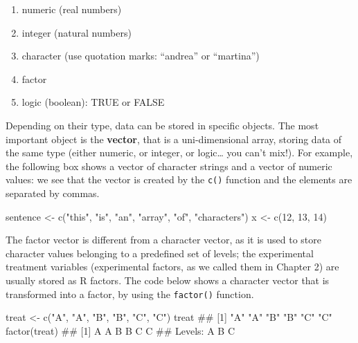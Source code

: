 \documentclass[a4paper,12pt,oneside]{book}
\providecommand{\tightlist}{%
  \setlength{\itemsep}{0pt}\setlength{\parskip}{0pt}}
\newenvironment{Shaded}{\begin{snugshade}}{\end{snugshade}}
\newcommand{\DecValTok}[1]{#1}
\newcommand{\StringTok}[1]{#1}
\newcommand{\DocumentationTok}[1]{#1}
\newcommand{\OtherTok}[1]{#1}
\newcommand{\FunctionTok}[1]{#1}
\newcommand{\NormalTok}[1]{#1}
\begin{document}
\begin{enumerate}
\def\labelenumi{\arabic{enumi}.}
\tightlist
\item
  numeric (real numbers)
\item
  integer (natural numbers)
\item
  character (use quotation marks: ``andrea'' or ``martina'')
\item
  factor
\item
  logic (boolean): TRUE or FALSE
\end{enumerate}

Depending on their type, data can be stored in specific objects. The most important object is the \textbf{vector}, that is a uni-dimensional array, storing data of the same type (either numeric, or integer, or logic\ldots{} you can't mix!). For example, the following box shows a vector of character strings and a vector of numeric values: we see that the vector is created by the \texttt{c()} function and the elements are separated by commas.

\begin{Shaded}
\begin{Highlighting}[]
\NormalTok{sentence }\OtherTok{\textless{}{-}} \FunctionTok{c}\NormalTok{(}\StringTok{"this"}\NormalTok{, }\StringTok{"is"}\NormalTok{, }\StringTok{"an"}\NormalTok{, }\StringTok{"array"}\NormalTok{, }\StringTok{"of"}\NormalTok{, }\StringTok{"characters"}\NormalTok{)}
\NormalTok{x }\OtherTok{\textless{}{-}} \FunctionTok{c}\NormalTok{(}\DecValTok{12}\NormalTok{, }\DecValTok{13}\NormalTok{, }\DecValTok{14}\NormalTok{)}
\end{Highlighting}
\end{Shaded}

The factor vector is different from a character vector, as it is used to store character values belonging to a predefined set of levels; the experimental treatment variables (experimental factors, as we called them in Chapter 2) are usually stored as R factors. The code below shows a character vector that is transformed into a factor, by using the \texttt{factor()} function.

\begin{Shaded}
\begin{Highlighting}[]
\NormalTok{treat  }\OtherTok{\textless{}{-}}  \FunctionTok{c}\NormalTok{(}\StringTok{"A"}\NormalTok{, }\StringTok{"A"}\NormalTok{, }\StringTok{"B"}\NormalTok{, }\StringTok{"B"}\NormalTok{, }\StringTok{"C"}\NormalTok{, }\StringTok{"C"}\NormalTok{)}
\NormalTok{treat}
\DocumentationTok{\#\# [1] "A" "A" "B" "B" "C" "C"}
\FunctionTok{factor}\NormalTok{(treat)}
\DocumentationTok{\#\# [1] A A B B C C}
\DocumentationTok{\#\# Levels: A B C}
\end{Highlighting}
\end{Shaded}
\end{document}
